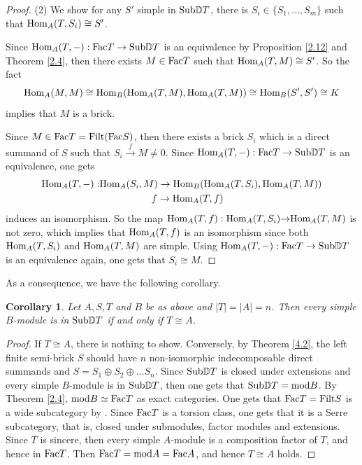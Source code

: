 \documentclass[a4paper]{amsart}
\newtheorem{cor}[thm]{Corollary}
\theoremstyle{definition}
\theoremstyle{remark}
\numberwithin{equation}{section}
\begin{document}
\begin{proof}
(2) We show for any $S'$ simple in $\textup{Sub}\mathbb{D}T$, there is $S_i \in \{S_1, \dots, S_m\}$ such that $\textup{Hom}_A(T, S_i) \cong S'$.

Since $\textup{Hom}_A(T, -): \textup{Fac}T \to \textup{Sub}\mathbb{D}T$ is an equivalence by Proposition \ref{2.12} and Theorem \ref{2.4}, then there exists $ M \in \textup{Fac}T$ such that $\textup{Hom}_A(T, M) \cong S'$.
So the fact $$ \textup{Hom}_A(M, M) \cong \textup{Hom}_B(\textup{Hom}_A(T, M), \textup{Hom}_A(T, M)) \cong \textup{Hom}_B(S', S')
\cong K$$ implies that $M$ is a brick.


Since $M \in \textup{Fac}T = \textup{Filt} (\textup{Fac}S)$, then there exists a brick $S_i$ which is a direct summand of $S$ such that $S_i \xrightarrow{f} M \ne 0$.
Since $\textup{Hom}_A(T, -): \textup{Fac}T \to \textup{Sub}\mathbb{D}T$ is an equivalence,
one gets
\begin{align*}
\textup{Hom}_A(T, -): &\textup{Hom}_A(S_i, M) \to \textup{Hom}_B (\textup{Hom}_A(T, S_i), \textup{Hom}_A(T, M))\\
\ \ \ \ \ \ &\ \ \ \ \ \ \ \ \ \ \ \ \ \ \ \  f \to \textup{Hom}_A(T, f)
\end{align*}
induces an isomorphism.
So the map $\textup{Hom}_A(T, f): \textup{Hom}_A(T, S_i){\rightarrow} \textup{Hom}_A(T, M)$ is not zero, which implies that $\textup{Hom}_A(T, f)$ is an isomorphism since both $\textup{Hom}_A(T, S_i)$ and $\textup{Hom}_A(T, M)$ are simple. Using $\textup{Hom}_A(T, -): \textup{Fac}T \to \textup{Sub}\mathbb{D}T$ is an equivalence again, one gets that $S_i\cong M$.
\end{proof}

As a consequence, we have the following corollary.

\begin{cor}\label{4.3} Let $A, S, T$ and $B$ be as above and $|T|=|A|=n$. Then every simple $B$-module is in $\textup{Sub}\mathbb{D}T$ if and only if $T\cong A$.
\end{cor}
\begin{proof} If $T\cong A$, there is nothing to show. Conversely, by Theorem \ref{4.2}, the left finite semi-brick $S$ should have $n$ non-isomorphic indecomposable direct summands and $S=S_1\oplus S_2\oplus\dots S_n$. Since $\textup{Sub}\mathbb{D}T$  is closed under extensions and every simple $B$-module is in $\textup{Sub}\mathbb{D}T$, then one gets that $\textup{Sub}\mathbb{D}T={\rm mod}B$. By Theorem \ref{2.4}, ${\rm mod} B\simeq {\rm Fac}T$ as exact categories. One gets that ${\rm Fac}T={\rm Filt} S$ is a wide subcategory by \cite[Proposition 2.17]{As}. Since ${\rm Fac}T$ is a torsion class, one gets that it is a Serre subcategory, that is, closed under submodules, factor modules and extensions. Since $T$ is sincere, then every simple $A$-module is a composition factor of $T$, and hence in ${\rm Fac}T$. Then ${\rm Fac}T={\rm mod}A={\rm Fac}A$, and hence $T\cong A$ holds.
\end{proof}
\end{document}
